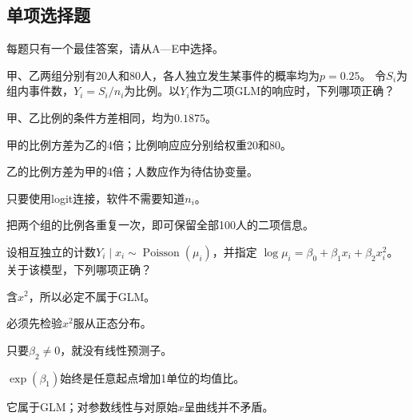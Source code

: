\subsection{单项选择题}
每题只有一个最佳答案，请从A—E中选择。

\par\noindent\begin{minipage}{\linewidth}
甲、乙两组分别有20人和80人，各人独立发生某事件的概率均为$p=0.25$。
令$S_i$为组内事件数，$Y_i=S_i/n_i$为比例。以$Y_i$作为二项GLM的响应时，下列哪项正确？
\begin{choices}
\item 甲、乙比例的条件方差相同，均为$0.1875$。
\item 甲的比例方差为乙的4倍；比例响应应分别给权重20和80。
\item 乙的比例方差为甲的4倍；人数应作为待估协变量。
\item 只要使用logit连接，软件不需要知道$n_i$。
\item 把两个组的比例各重复一次，即可保留全部100人的二项信息。
\end{choices}
\end{minipage}\par\medskip

\par\noindent\begin{minipage}{\linewidth}
设相互独立的计数$Y_i\mid x_i\sim\operatorname{Poisson}(\mu_i)$，并指定
$\log\mu_i=\beta_0+\beta_1x_i+\beta_2x_i^2$。关于该模型，下列哪项正确？
\begin{choices}
\item 含$x^2$，所以必定不属于GLM。
\item 必须先检验$x^2$服从正态分布。
\item 只要$\beta_2\ne0$，就没有线性预测子。
\item $\exp(\beta_1)$始终是任意起点增加1单位的均值比。
\item 它属于GLM；对参数线性与对原始$x$呈曲线并不矛盾。
\end{choices}
\end{minipage}\par\medskip

